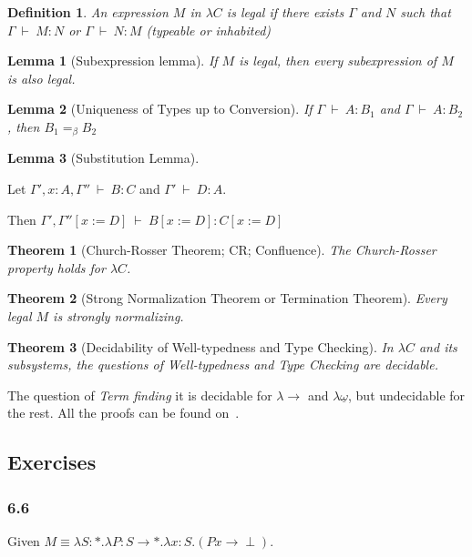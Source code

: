 \documentclass[12pt, a4paper]{article}
\newcommand{\deriv}{\ \vdash\ }
\newtheorem{theorem}{Theorem}[section]
\newtheorem{definition}{Definition}[section]
\newtheorem{lemma}{Lemma}[section]
\begin{document}
\begin{definition}
    An expression $M$ in $\lambda C$ is legal if there exists $\Gamma$ and $N$ such that $\Gamma \deriv M : N$ or $\Gamma \deriv N : M$ (typeable or inhabited)
\end{definition}

\begin{lemma}[Subexpression lemma]
    If $M$ is legal, then every subexpression of $M$ is also legal.
\end{lemma}

\begin{lemma}[Uniqueness of Types up to Conversion]
    If $\Gamma \deriv A : B_1$ and $\Gamma \deriv A : B_2$, then $B_1 =_\beta B_2$
\end{lemma}

\begin{lemma}[Substitution Lemma]
\end{lemma}
Let $\Gamma', x : A, \Gamma'' \deriv B : C$ and $\Gamma' \deriv D : A$.

Then $\Gamma', \Gamma''[x := D] \deriv B[x := D] : C[x := D]$

\begin{theorem}[Church-Rosser Theorem; CR; Confluence]
    The Church-Rosser property holds for $\lambda C$.
\end{theorem}

\begin{theorem}[Strong Normalization Theorem or Termination Theorem]
    Every legal $M$ is strongly normalizing.
\end{theorem}

\begin{theorem}[Decidability of Well-typedness and Type Checking]
    In $\lambda C$ and its subsystems, the questions of Well-typedness and Type Checking are decidable.
\end{theorem}

The question of \textit{Term finding} it is decidable for $\lambda \to$ and $\lambda \underline{\omega}$, but undecidable for the rest.
All the proofs can be found on~\cite{barendregt}.

\subsection{Exercises}
\subsubsection{6.6}
Given $M \equiv \lambda S : *. \lambda P : S \to *. \lambda x : S. (P x \to \perp)$.
\end{document}
